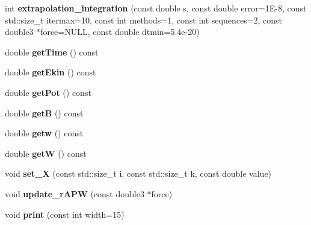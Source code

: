 \begin{DoxyCompactItemize}
\item 
\hypertarget{classchain_abe96df70b2ba53b02eca60d1e03ec17c}{
int {\bfseries extrapolation\_\-integration} (const double s, const double error=1E-\/8, const std::size\_\-t itermax=10, const int methods=1, const int sequences=2, const double3 $\ast$force=NULL, const double dtmin=5.4e-\/20)}
\label{classchain_abe96df70b2ba53b02eca60d1e03ec17c}

\item 
\hypertarget{classchain_a4d3fee933c9eb286f0fd5c8bf4d33ad0}{
double {\bfseries getTime} () const }
\label{classchain_a4d3fee933c9eb286f0fd5c8bf4d33ad0}

\item 
\hypertarget{classchain_a205cebb0df7069dfbfb485b608dd54b1}{
double {\bfseries getEkin} () const }
\label{classchain_a205cebb0df7069dfbfb485b608dd54b1}

\item 
\hypertarget{classchain_ae4a94b896f99ec793f2a1ef1a758bdee}{
double {\bfseries getPot} () const }
\label{classchain_ae4a94b896f99ec793f2a1ef1a758bdee}

\item 
\hypertarget{classchain_a98ea0efdd86a780e497cc1c9ed6ef832}{
double {\bfseries getB} () const }
\label{classchain_a98ea0efdd86a780e497cc1c9ed6ef832}

\item 
\hypertarget{classchain_a5605d2319e60e5fa6b1d9609d83b625d}{
double {\bfseries getw} () const }
\label{classchain_a5605d2319e60e5fa6b1d9609d83b625d}

\item 
\hypertarget{classchain_ae8da9f979a477c47b80673f95eef6607}{
double {\bfseries getW} () const }
\label{classchain_ae8da9f979a477c47b80673f95eef6607}

\item 
\hypertarget{classchain_a84a64c135620027cdc63cb1a72be6e37}{
void {\bfseries set\_\-X} (const std::size\_\-t i, const std::size\_\-t k, const double value)}
\label{classchain_a84a64c135620027cdc63cb1a72be6e37}

\item 
\hypertarget{classchain_ac605b407a47aa202afe6f5bd0a3163ec}{
void {\bfseries update\_\-rAPW} (const double3 $\ast$force)}
\label{classchain_ac605b407a47aa202afe6f5bd0a3163ec}

\item 
\hypertarget{classchain_a573ade699785fd4f3d5433aaed7381d0}{
void {\bfseries print} (const int width=15)}
\label{classchain_a573ade699785fd4f3d5433aaed7381d0}

\end{DoxyCompactItemize}
